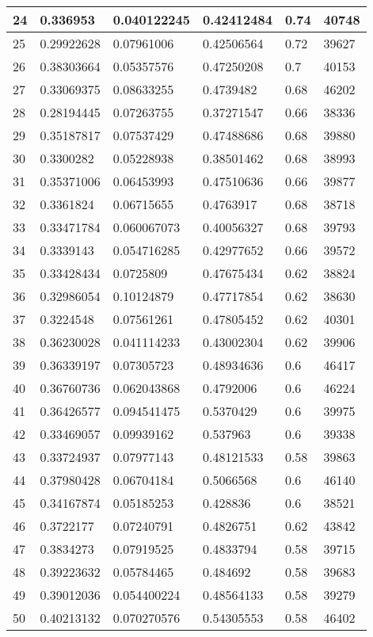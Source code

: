 \begin{longtable}{|l|l|l|l|l|l|}
24 & 0.336953 & 0.040122245 & 0.42412484 & 0.74 & 40748 \\ \hline 
25 & 0.29922628 & 0.07961006 & 0.42506564 & 0.72 & 39627 \\ \hline 
26 & 0.38303664 & 0.05357576 & 0.47250208 & 0.7 & 40153 \\ \hline 
27 & 0.33069375 & 0.08633255 & 0.4739482 & 0.68 & 46202 \\ \hline 
28 & 0.28194445 & 0.07263755 & 0.37271547 & 0.66 & 38336 \\ \hline 
29 & 0.35187817 & 0.07537429 & 0.47488686 & 0.68 & 39880 \\ \hline 
30 & 0.3300282 & 0.05228938 & 0.38501462 & 0.68 & 38993 \\ \hline 
31 & 0.35371006 & 0.06453993 & 0.47510636 & 0.66 & 39877 \\ \hline 
32 & 0.3361824 & 0.06715655 & 0.4763917 & 0.68 & 38718 \\ \hline 
33 & 0.33471784 & 0.060067073 & 0.40056327 & 0.68 & 39793 \\ \hline 
34 & 0.3339143 & 0.054716285 & 0.42977652 & 0.66 & 39572 \\ \hline 
35 & 0.33428434 & 0.0725809 & 0.47675434 & 0.62 & 38824 \\ \hline 
36 & 0.32986054 & 0.10124879 & 0.47717854 & 0.62 & 38630 \\ \hline 
37 & 0.3224548 & 0.07561261 & 0.47805452 & 0.62 & 40301 \\ \hline 
38 & 0.36230028 & 0.041114233 & 0.43002304 & 0.62 & 39906 \\ \hline 
39 & 0.36339197 & 0.07305723 & 0.48934636 & 0.6 & 46417 \\ \hline 
40 & 0.36760736 & 0.062043868 & 0.4792006 & 0.6 & 46224 \\ \hline 
41 & 0.36426577 & 0.094541475 & 0.5370429 & 0.6 & 39975 \\ \hline 
42 & 0.33469057 & 0.09939162 & 0.537963 & 0.6 & 39338 \\ \hline 
43 & 0.33724937 & 0.07977143 & 0.48121533 & 0.58 & 39863 \\ \hline 
44 & 0.37980428 & 0.06704184 & 0.5066568 & 0.6 & 46140 \\ \hline 
45 & 0.34167874 & 0.05185253 & 0.428836 & 0.6 & 38521 \\ \hline 
46 & 0.3722177 & 0.07240791 & 0.4826751 & 0.62 & 43842 \\ \hline 
47 & 0.3834273 & 0.07919525 & 0.4833794 & 0.58 & 39715 \\ \hline 
48 & 0.39223632 & 0.05784465 & 0.484692 & 0.58 & 39683 \\ \hline 
49 & 0.39012036 & 0.054400224 & 0.48564133 & 0.58 & 39279 \\ \hline 
50 & 0.40213132 & 0.070270576 & 0.54305553 & 0.58 & 46402 \\ \hline 
\end{longtable}